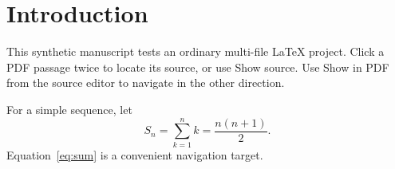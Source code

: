 \section{Introduction}
\label{sec:introduction}
This synthetic manuscript tests an ordinary multi-file LaTeX project.
Click a PDF passage twice to locate its source, or use Show source.
Use Show in PDF from the source editor to navigate in the other direction.

For a simple sequence, let
\begin{equation}
  S_n = \sum_{k=1}^{n} k = \frac{n(n+1)}{2}.
  \label{eq:sum}
\end{equation}
Equation~\ref{eq:sum} is a convenient navigation target.
